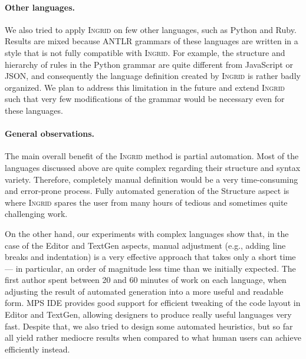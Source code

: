 \paragraph{Other languages.}
We also tried to apply \textsc{Ingrid} on few other languages, such as Python and Ruby.
Results are mixed because ANTLR grammars of these languages are written in a style that is not fully compatible with \textsc{Ingrid}.
For example, the structure and hierarchy of rules in the Python grammar are quite different from JavaScript or JSON, and consequently the language definition created by \textsc{Ingrid} is rather badly organized.
We plan to address this limitation in the future and extend \textsc{Ingrid} such that very few modifications of the grammar would be necessary even for these languages.

\paragraph{General observations.}
The main overall benefit of the \textsc{Ingrid} method is partial automation.
Most of the languages discussed above are quite complex regarding their structure and syntax variety.
Therefore, completely manual definition would be a very time-consuming and error-prone process.
Fully automated generation of the Structure aspect is where \textsc{Ingrid} spares the user from many hours of tedious and sometimes quite challenging work.

On the other hand, our experiments with complex languages show that, in the case of the Editor and TextGen aspects, manual adjustment (e.g., adding line breaks and indentation) is a very effective approach that takes only a short time --- in particular, an order of magnitude less time than we initially expected.
The first author spent between 20 and 60 minutes of work on each language, when adjusting the result of automated generation into a more useful and readable form.
MPS IDE provides good support for efficient tweaking of the code layout in Editor and TextGen, allowing designers to produce really useful languages very fast.
Despite that, we also tried to design some automated heuristics, but so far all yield rather mediocre results when compared to what human users can achieve efficiently instead.

